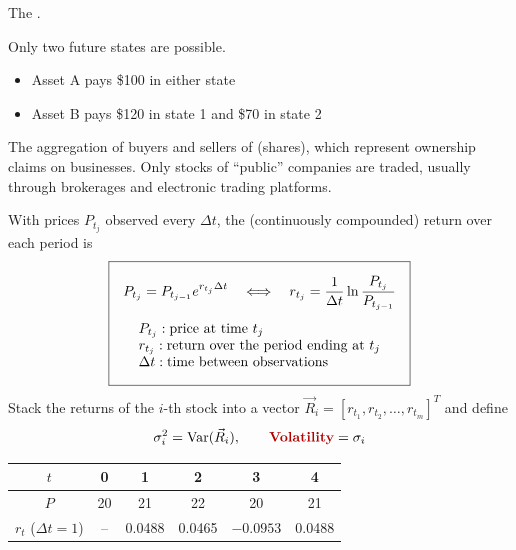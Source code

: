 \begin{definition}
    The .
\end{definition}

\begin{example}
    Only two future states are possible.
    \begin{itemize}
        \item Asset A pays \$100 in either state
        \item Asset B pays \$120 in state 1 and \$70 in state 2
    \end{itemize}
\end{example}

\begin{definition}
    The aggregation of buyers and sellers of  (shares), which
    represent ownership claims on businesses. Only stocks of ``public''
    companies are traded, usually through brokerages and electronic trading
    platforms.
\end{definition}

With prices $P_{t_j}$ observed every $\Delta t$, the (continuously
compounded) return over each period is
\[\boxed{\begin{gathered}
    P_{t_j} = P_{t_{j-1}}e^{r_{t_j}\Delta t} \quad\Longleftrightarrow\quad r_{t_j} = \frac{1}{\Delta t}\ln\frac{P_{t_j}}{P_{t_{j-1}}}\\[4pt]
    \begin{array}{@{}l@{}}
        P_{t_j}: \text{price at time } t_j\\
        r_{t_j}: \text{return over the period ending at } t_j\\
        \Delta t: \text{time between observations}
    \end{array}
\end{gathered}}\]
Stack the returns of the $i$-th stock into a vector
$\vec R_i = [r_{t_1}, r_{t_2}, \dots, r_{t_m}]^T$ and define
\[\sigma_i^2 = \operatorname{Var}(\vec R_i), \qquad \rb{Volatility} = \sigma_i\]

\begin{example}
    \begin{center}
    \begin{tabular}{cccccc}
        \toprule
        $t$ & 0 & 1 & 2 & 3 & 4 \\
        \midrule
        $P$ & 20 & 21 & 22 & 20 & 21 \\
        $r_t$ ($\Delta t = 1$) & -- & 0.0488 & 0.0465 & $-0.0953$ & 0.0488 \\
        \bottomrule
    \end{tabular}
    \end{center}
\end{example}

